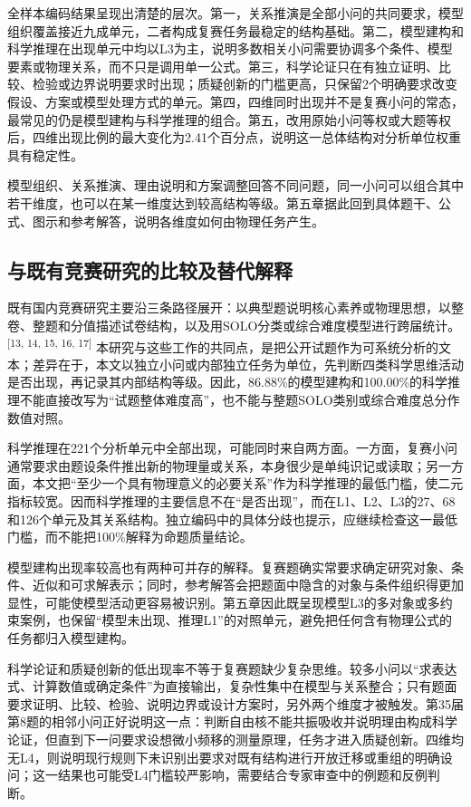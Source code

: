 \documentclass[
  12pt,
  a4paper,twoside,openany]{ctexbook}
\begin{document}
全样本编码结果呈现出清楚的层次。第一，关系推演是全部小问的共同要求，模型组织覆盖接近九成单元，二者构成复赛任务最稳定的结构基础。第二，模型建构和科学推理在出现单元中均以L3为主，说明多数相关小问需要协调多个条件、模型要素或物理关系，而不只是调用单一公式。第三，科学论证只在有独立证明、比较、检验或边界说明要求时出现；质疑创新的门槛更高，只保留2个明确要求改变假设、方案或模型处理方式的单元。第四，四维同时出现并不是复赛小问的常态，最常见的仍是模型建构与科学推理的组合。第五，改用原始小问等权或大题等权后，四维出现比例的最大变化为2.41个百分点，说明这一总体结构对分析单位权重具有稳定性。

模型组织、关系推演、理由说明和方案调整回答不同问题，同一小问可以组合其中若干维度，也可以在某一维度达到较高结构等级。第五章据此回到具体题干、公式、图示和参考解答，说明各维度如何由物理任务产生。

\subsection{与既有竞赛研究的比较及替代解释}\label{ux4e0eux65e2ux6709ux7adeux8d5bux7814ux7a76ux7684ux6bd4ux8f83ux53caux66ffux4ee3ux89e3ux91ca}

既有国内竞赛研究主要沿三条路径展开：以典型题说明核心素养或物理思想，以整卷、整题和分值描述试卷结构，以及用SOLO分类或综合难度模型进行跨届统计。\textsuperscript{[13, 14, 15, 16, 17]}
本研究与这些工作的共同点，是把公开试题作为可系统分析的文本；差异在于，本文以独立小问或内部独立任务为单位，先判断四类科学思维活动是否出现，再记录其内部结构等级。因此，86.88\%的模型建构和100.00\%的科学推理不能直接改写为``试题整体难度高''，也不能与整题SOLO类别或综合难度总分作数值对照。

科学推理在221个分析单元中全部出现，可能同时来自两方面。一方面，复赛小问通常要求由题设条件推出新的物理量或关系，本身很少是单纯识记或读取；另一方面，本文把``至少一个具有物理意义的必要关系''作为科学推理的最低门槛，使二元指标较宽。因而科学推理的主要信息不在``是否出现''，而在L1、L2、L3的27、68和126个单元及其关系结构。独立编码中的具体分歧也提示，应继续检查这一最低门槛，而不能把100\%解释为命题质量结论。

模型建构出现率较高也有两种可并存的解释。复赛题确实常要求确定研究对象、条件、近似和可求解表示；同时，参考解答会把题面中隐含的对象与条件组织得更加显性，可能使模型活动更容易被识别。第五章因此既呈现模型L3的多对象或多约束案例，也保留``模型未出现、推理L1''的对照单元，避免把任何含有物理公式的任务都归入模型建构。

科学论证和质疑创新的低出现率不等于复赛题缺少复杂思维。较多小问以``求表达式、计算数值或确定条件''为直接输出，复杂性集中在模型与关系整合；只有题面要求证明、比较、检验、说明边界或设计方案时，另外两个维度才被触发。第35届第8题的相邻小问正好说明这一点：判断自由核不能共振吸收并说明理由构成科学论证，但直到下一问要求设想微小频移的测量原理，任务才进入质疑创新。四维均无L4，则说明现行规则下未识别出要求对既有结构进行开放迁移或重组的明确设问；这一结果也可能受L4门槛较严影响，需要结合专家审查中的例题和反例判断。
\end{document}
